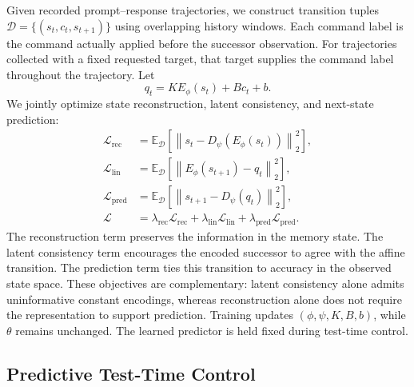 Given recorded prompt--response trajectories, we construct transition
tuples $\mathcal{D}=\{(s_t,c_t,s_{t+1})\}$ using overlapping history
windows. Each command label is the command actually applied before the
successor observation. For trajectories collected with a fixed
requested target, that target supplies the command label throughout
the trajectory. Let
\begin{equation}
    q_t
    =
    K E_{\phi}(s_t)+B c_t+b.
    \label{eq:training_transition}
\end{equation}
We jointly optimize state reconstruction, latent consistency, and
next-state prediction:
\begin{equation}
    \begin{aligned}
        \mathcal{L}_{\mathrm{rec}}
        &=
        \mathbb{E}_{\mathcal{D}}\!\left[
            \left\|
                s_t-D_{\psi}(E_{\phi}(s_t))
            \right\|_2^2
        \right],\\
        \mathcal{L}_{\mathrm{lin}}
        &=
        \mathbb{E}_{\mathcal{D}}\!\left[
            \left\|
                E_{\phi}(s_{t+1})-q_t
            \right\|_2^2
        \right],\\
        \mathcal{L}_{\mathrm{pred}}
        &=
        \mathbb{E}_{\mathcal{D}}\!\left[
            \left\|
                s_{t+1}-D_{\psi}(q_t)
            \right\|_2^2
        \right],\\
        \mathcal{L}
        &=
        \lambda_{\mathrm{rec}}\mathcal{L}_{\mathrm{rec}}
        +
        \lambda_{\mathrm{lin}}\mathcal{L}_{\mathrm{lin}}
        +
        \lambda_{\mathrm{pred}}\mathcal{L}_{\mathrm{pred}}.
    \end{aligned}
    \label{eq:training_objective}
\end{equation}
The reconstruction term preserves the information in the memory state.
The latent consistency term encourages the encoded successor to agree
with the affine transition. The prediction term ties this transition
to accuracy in the observed state space. These objectives are
complementary: latent consistency alone admits uninformative constant
encodings, whereas reconstruction alone does not require the
representation to support prediction. Training updates
$(\phi,\psi,K,B,b)$, while $\theta$ remains unchanged. The learned
predictor is held fixed during test-time control.

\subsection{Predictive Test-Time Control}
\label{sec:control}

